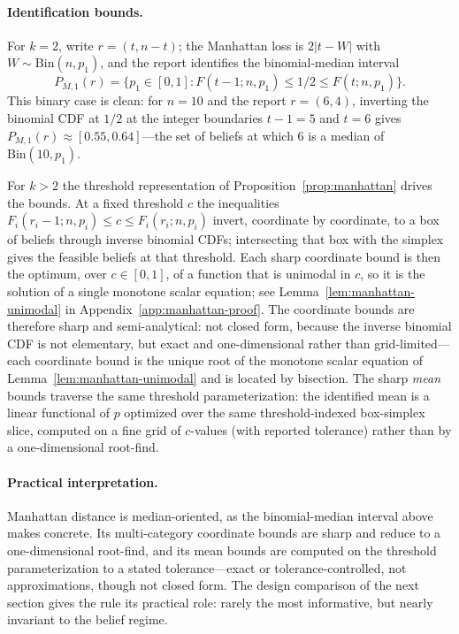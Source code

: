 \paragraph{Identification bounds.}
For \(k=2\), write \(r=(t,n-t)\); the Manhattan loss is \(2|t-W|\) with \(W\sim\mathrm{Bin}(n,p_1)\), and the report identifies the binomial-median interval
\[
P_{M,1}(r)=\{p_1\in[0,1]:F(t-1;n,p_1)\le 1/2\le F(t;n,p_1)\}.
\]
This binary case is clean: for \(n=10\) and the report \(r=(6,4)\), inverting the binomial CDF at \(1/2\) at the integer boundaries \(t-1=5\) and \(t=6\) gives \(P_{M,1}(r)\approx[0.55, 0.64]\)---the set of beliefs at which 6 is a median of \(\mathrm{Bin}(10,p_1)\).

For \(k>2\) the threshold representation of Proposition~\ref{prop:manhattan} drives the bounds.
At a fixed threshold \(c\) the inequalities \(F_i(r_i-1;n,p_i)\le c\le F_i(r_i;n,p_i)\) invert, coordinate by coordinate, to a box of beliefs through inverse binomial CDFs; intersecting that box with the simplex gives the feasible beliefs at that threshold.
Each sharp coordinate bound is then the optimum, over \(c\in[0,1]\), of a function that is unimodal in \(c\), so it is the solution of a single monotone scalar equation; see Lemma~\ref{lem:manhattan-unimodal} in Appendix~\ref{app:manhattan-proof}.
The coordinate bounds are therefore sharp and semi-analytical: not closed form, because the inverse binomial CDF is not elementary, but exact and one-dimensional rather than grid-limited---each coordinate bound is the unique root of the monotone scalar equation of Lemma~\ref{lem:manhattan-unimodal} and is located by bisection.
The sharp \emph{mean} bounds traverse the same threshold parameterization: the identified mean is a linear functional of \(p\) optimized over the same threshold-indexed box-simplex slice, computed on a fine grid of \(c\)-values (with reported tolerance) rather than by a one-dimensional root-find.

\paragraph{Practical interpretation.}
Manhattan distance is median-oriented, as the binomial-median interval above makes concrete.
Its multi-category coordinate bounds are sharp and reduce to a one-dimensional root-find, and its mean bounds are computed on the threshold parameterization to a stated tolerance---exact or tolerance-controlled, not approximations, though not closed form.
The design comparison of the next section gives the rule its practical role: rarely the most informative, but nearly invariant to the belief regime.

